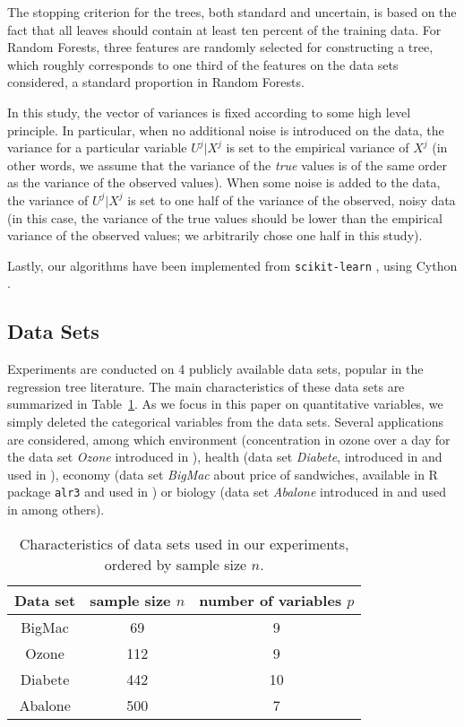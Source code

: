 The stopping criterion for the trees, both standard and uncertain, is based on the fact that all leaves should contain at least ten percent of the training data. For Random Forests, three features are randomly selected for constructing a tree, which roughly corresponds to one third of the features on the data sets considered, a standard proportion in Random Forests.

In this study, the vector of variances is fixed according to some high level principle. In particular, when no additional noise is introduced on the data, the variance for a particular variable $U^j|X^j$ is set to the empirical variance of $X^j$ (in other words, we assume that the variance of the \textit{true} values is of the same order as the variance of the observed values). When some noise is added to the data, the variance of $U^j|X^j$ is set to one half of the variance of the observed, noisy data (in this case, the variance of the true values should be lower than the empirical variance of the observed values; we arbitrarily chose one half in this study).

Lastly, our algorithms have been implemented from \texttt{scikit-learn} \cite{Scikit-learn}, using Cython \cite{Behnel}.

\subsection{Data Sets} 
\label{sec:data}
Experiments are conducted on 4 publicly available data sets, popular in the regression tree literature.  The main characteristics of these data sets are summarized in Table~\ref{tab:data set-description}.
As we focus in this paper on quantitative variables, we simply deleted the categorical variables from the data sets.
Several applications are considered, among which environment (concentration in ozone over a day for the data set \textit{Ozone} introduced in \cite{cornillon}), health (data set \textit{Diabete}, introduced in \cite{Scikit-learn} and used in \cite{LAR}), economy (data set \textit{BigMac} about price of sandwiches, available in R package \verb?alr3?  and used in \cite{meinshausen2006quantile}) or biology (data set \textit{Abalone} introduced in \cite{Warwick} and used in \cite{meinshausen2006quantile} among others).

\begin{table}[ht!]
  \centering
      \begin{tabular}{ccc}
        \hline
        Data set & sample size $n$ & number of variables $p$ \\
        \hline
        BigMac & 69&9 \\
        Ozone & 112 & 9 \\
        Diabete & 442 & 10 \\
        Abalone & 500 & 7\\
        \hline
      \end{tabular}
\caption{Characteristics of data sets used in our experiments, ordered by sample size $n$.}
\label{tab:data set-description}
\end{table}
    
